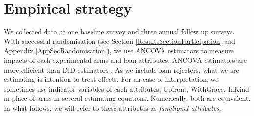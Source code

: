 \begin{figure}
\end{figure}

\section{Empirical strategy}
\label{SecEmpiricalStrategy}


	We collected data at one baseline survey and three annual follow up surveys. With successful randomisation (see Section \ref{ResultsSectionParticipation} and Appendix \ref{AppSecRandomisation}), we use ANCOVA estimators to measure impacts of each experimental arms and loan attributes. ANCOVA estimators are more efficient than DID estimators \citep{FrisonPocock1992, McKenzie2012}. As we include loan rejecters, what we are estimating is intention-to-treat effects. For an ease of interpretation, we sometimes use indicator variables of each attributes, \textsf{Upfront, WithGrace, InKind} in place of arms in several estimating equations. Numerically, both are equivalent. In what follows, we will refer to these attributes as \textit{functional attributes}.
	
